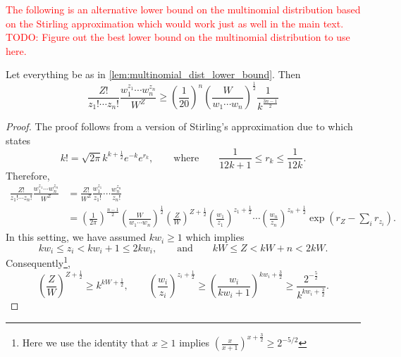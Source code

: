 \documentclass[notitlepage, 10pt]{article}
\begin{document}
\textcolor{red}{The following is an alternative lower bound on the multinomial distribution based on the Stirling approximation which would work just as well in the main text. TODO: Figure out the best lower bound on the multinomial distribution to use here.}
\begin{lem}
    \label{lem:multinomial_dist_lower_bound_alt}
    Let everything be as in \cref{lem:multinomial_dist_lower_bound}.
    Then
    \begin{equation}
        \label{eq:multinomial_dist_lower_bound_alt}
        \frac{Z!}{z_1! \cdots z_n!}\frac{w_1^{z_{1}}\cdots w_{n}^{z_{n}}}{W^{Z}} \geq \left(\frac{1}{20}\right)^{n}\left(\frac{W}{w_1\cdots w_n}\right)^{\frac{1}{2}}\frac{1}{k^{\frac{3n-1}{2}}}
    \end{equation}
\end{lem}
\begin{proof}
    The proof follows from a version of Stirling's approximation due to \citeauthor{robbins1955remark} \cite{robbins1955remark} which states
    \begin{equation}
        k! = \sqrt{2\pi} k^{k+\frac{1}{2}} e^{-k} e^{r_k}, 
        \qquad
        \text{where}
        \qquad
        \frac{1}{12k+1}\leq r_k \leq \frac{1}{12k}.
    \end{equation}
    Therefore,
    \begin{align}
        \frac{Z!}{z_1! \cdots z_n!}\frac{w_1^{z_{1}}\cdots w_{n}^{z_{n}}}{W^{Z}}
        &=\frac{Z!}{W^{Z}}\frac{w_1^{z_{1}}}{z_1!}\cdots \frac{w_n^{z_{n}}}{z_n!} \\
        &=\left(\frac{1}{2\pi}\right)^{\frac{n-1}{2}}\left(\frac{W}{w_1\cdots w_n}\right)^{\frac{1}{2}}  \left(\frac{Z}{W}\right)^{Z+\frac{1}{2}} \left(\frac{w_1}{z_1}\right)^{z_1+\frac{1}{2}} \cdots \left(\frac{w_n}{z_n}\right)^{z_n+\frac{1}{2}} \exp\left(r_{Z} - \sum_{i} r_{z_i}\right).
    \end{align}
    In this setting, we have assumed $k w_i \geq 1$ which implies
    \begin{equation}
        kw_i \leq z_i < kw_i + 1 \leq 2kw_i,
        \qquad \text{and} \qquad
        kW \leq Z < kW+n < 2kW.
    \end{equation}
    Consequently\footnote{Here we use the identity that $x \geq 1$ implies $\left(\frac{x}{x+1}\right)^{x+\frac{3}{2}} \geq 2^{-5/2}$},
    \begin{equation}
        \left(\frac{Z}{W}\right)^{Z+\frac{1}{2}} \geq k^{kW + \frac{1}{2}}, \qquad
        \left(\frac{w_i}{z_i}\right)^{z_i +\frac{1}{2}} \geq \left(\frac{w_i}{kw_i + 1}\right)^{kw_i + \frac{3}{2}} \geq \frac{2^{-\frac{5}{2}}}{k^{kw_i+\frac{3}{2}}}.

\end{equation}
\end{proof}
\end{document}

